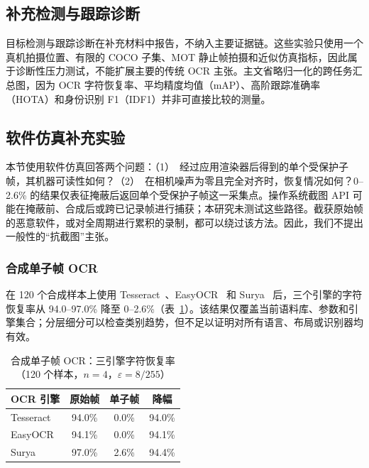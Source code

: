 \documentclass{ieeeaccess}
\begin{document}
\subsection{补充检测与跟踪诊断}

目标检测与跟踪诊断在补充材料中报告，不纳入主要证据链。这些实验只使用一个真机拍摄位置、有限的 COCO 子集、MOT 静止帧拍摄和近似仿真指标，因此属于诊断性压力测试，不能扩展主要的传统 OCR 主张。主文省略归一化的跨任务汇总图，因为 OCR 字符恢复率、平均精度均值（mAP）、高阶跟踪准确率（HOTA）和身份识别 F1（IDF1）并非可直接比较的测量。

\subsection{软件仿真补充实验}

本节使用软件仿真回答两个问题：（1）~经过应用渲染器后得到的单个受保护子帧，其机器可读性如何？（2）~在相机噪声为零且完全对齐时，恢复情况如何？0--2.6\% 的结果仅表征掩蔽后返回单个受保护子帧这一采集点。操作系统截图 API 可能在掩蔽前、合成后或跨已记录帧进行捕获；本研究未测试这些路径。截获原始帧的恶意软件，或对全周期进行累积的录制，都可以绕过该方法。因此，我们不提出一般性的“抗截图”主张。

\subsubsection{合成单子帧 OCR}
在 120 个合成样本上使用 Tesseract~\cite{b_smith2007}、EasyOCR~\cite{b_easyocr2020} 和 Surya~\cite{b_surya2024} 后，三个引擎的字符恢复率从 94.0--97.0\% 降至 0--2.6\%（表~\ref{tab:ocr_corpus}）。该结果仅覆盖当前语料库、参数和引擎集合；分层细分可以检查类别趋势，但不足以证明对所有语言、布局或识别器均有效。

\begin{table}[!t]
\caption{合成单子帧 OCR：三引擎字符恢复率（120 个样本，$n=4$，$\varepsilon=8/255$）}
\label{tab:ocr_corpus}
\centering
\footnotesize
\begin{tabular}{lccc}
\toprule
OCR 引擎 & 原始帧 & 单子帧 & 降幅 \\
\midrule
Tesseract & 94.0\% & 0.0\% & 94.0\% \\
EasyOCR & 94.1\% & 0.0\% & 94.1\% \\
Surya & 97.0\% & 2.6\% & 94.4\% \\
\bottomrule
\end{tabular}
\end{table}
\end{document}
